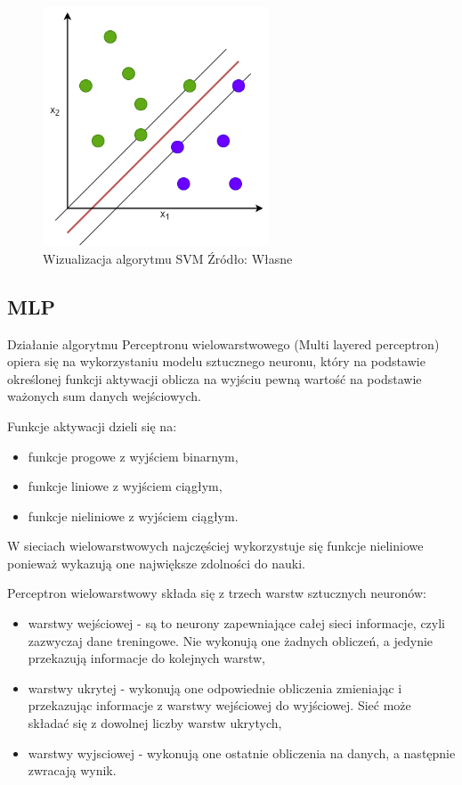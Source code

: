 \begin{figure}[h]
    \centering
    \includegraphics[width=0.6\textwidth]{./Img/SVM.png}
    \caption{Wizualizacja algorytmu SVM Źródło: Własne}
\end{figure}

\subsection{MLP}

Działanie algorytmu Perceptronu wielowarstwowego (Multi layered perceptron) 
opiera się na wykorzystaniu modelu sztucznego neuronu, który na podstawie określonej
funkcji aktywacji oblicza na wyjściu pewną wartość na podstawie ważonych sum danych
wejściowych. 

Funkcje aktywacji dzieli się na:
\begin{itemize}
    \item funkcje progowe z wyjściem binarnym,
    \item funkcje liniowe z wyjściem ciągłym,
    \item funkcje nieliniowe z wyjściem ciągłym.
\end{itemize}
W sieciach wielowarstwowych najczęściej wykorzystuje się funkcje nieliniowe ponieważ 
wykazują one największe zdolności do nauki.

Perceptron wielowarstwowy składa się z trzech warstw sztucznych neuronów: 
\begin{itemize}
    \item warstwy wejściowej - są to neurony zapewniające całej sieci
    informacje, czyli zazwyczaj dane treningowe. Nie wykonują one żadnych obliczeń,
    a jedynie przekazują informacje do kolejnych warstw,
    \item warstwy ukrytej - wykonują one odpowiednie obliczenia zmieniając 
    i przekazując informacje z warstwy wejściowej do wyjściowej. Sieć może składać
    się z dowolnej liczby warstw ukrytych,
    \item warstwy wyjsciowej - wykonują one ostatnie obliczenia na danych, 
    a następnie zwracają wynik.
\end{itemize}

